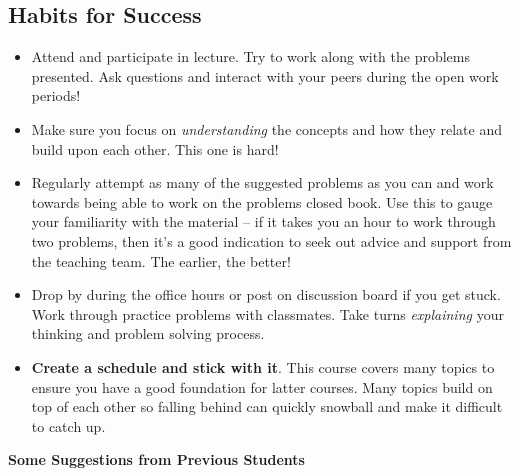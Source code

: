 \subsection*{Habits for Success}

\begin{itemize}
    \item Attend and participate in lecture. Try to work along with the problems presented. Ask questions and interact with your peers during the open work periods! 
    \item Make sure you focus on \textit{understanding} the concepts and how they relate and build upon each other. This one is hard! 
    \item Regularly attempt as many of the suggested problems as you can and work towards being able to work on the problems closed book. Use this to gauge your familiarity with the material -- if it takes you an hour to work through two problems, then it's a good indication to seek out advice and support from the teaching team. The earlier, the better! 
    \item Drop by during the office hours or post on discussion board if you get stuck. Work through practice problems with classmates. Take turns \textit{explaining} your thinking and problem solving process. 
    \item \textbf{Create a schedule and stick with it}. This course covers many topics to ensure you have a good foundation for latter courses. Many topics build on top of each other so falling behind can quickly snowball and make it difficult to catch up.
\end{itemize}

\textbf{Some Suggestions from Previous Students}


